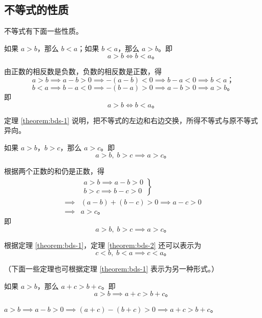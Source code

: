 \subsection{不等式的性质}\label{subsec:3-2}

不等式有下面一些性质。

\begin{theorem} \label{theorem:bds-1}
    如果 $a > b$，那么 $b < a$；如果 $b < a$，那么 $a > b$。即
    $$ a > b \iff b < a \text{。} $$
\end{theorem}

\zhengming 由正数的相反数是负数，负数的相反数是正数，得
$$ a > b \implies a - b > 0 \implies -(a - b) < 0 \implies b - a < 0 \implies b < a \text{；} $$
$$ b < a \implies b - a < 0 \implies -(b - a) > 0 \implies a - b > 0 \implies a > b \text{。} $$
即
$$ a > b \iff b < a \text{。} $$


定理 \ref{theorem:bds-1} 说明，把不等式的左边和右边交换，所得不等式与原不等式异向。

\begin{theorem} \label{theorem:bds-2}
    如果 $a > b$，$b > c$，那么 $a > c$。即
    $$ a > b, \; b > c \implies a > c \text{。} $$
\end{theorem}

\zhengming 根据两个正数的和仍是正数，得
\begin{align*}
    &   \left.
            \begin{array}{l}
                a > b \implies a - b > 0 \\
                b > c \implies b - c > 0
            \end{array}
        \right\} \\
    \implies & (a - b) + (b - c) > 0 \implies a - c > 0 \\
    \implies & a > c \text{。}
\end{align*}
即
$$ a > b, \; b > c \implies a > c \text{。} $$

根据定理 \ref{theorem:bds-1}，定理 \ref{theorem:bds-2} 还可以表示为
$$ c < b, \; b < a \implies c < a \text{。} $$

（下面一些定理也可根据定理 \ref{theorem:bds-1} 表示为另一种形式。）

\begin{theorem} \label{theorem:bds-3}
    如果 $a > b$，那么 $a + c > b + c$。即
    $$ a > b \implies a + c > b + c \text{。} $$
\end{theorem}

\zhengming $ a > b \implies a - b > 0 \implies (a + c) - (b + c) > 0 \implies a + c > b + c $。

